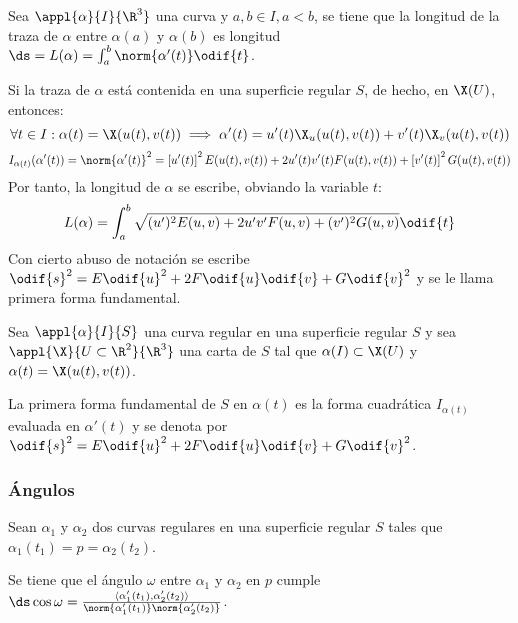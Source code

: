 Sea $\appl{\alpha}{I}{\R^3}$ una curva y $a, b \in I, a < b$, se tiene que la longitud de la traza de $\alpha$ entre $\alpha(a)$ y $\alpha(b)$ es longitud $\ds = L(\alpha) = \int_{a}^{b} \norm{\alpha'(t)} \odif{t}$.

Si la traza de $\alpha$ está contenida en una superficie regular $S$, de hecho, en $\X(U)$, entonces:
\[\forall t \in I : \alpha(t) = \X(u(t), v(t)) \implies \alpha'(t) = u'(t)\X_u(u(t), v(t)) + v'(t)\X_v(u(t), v(t))\]
\[I_{\alpha(t)}(\alpha'(t)) = \norm{\alpha'(t)}^2 = \left[u'(t)\right]^2E(u(t), v(t)) + 2u'(t)v'(t)F(u(t), v(t)) + \left[v'(t)\right]^2G(u(t), v(t))\]
Por tanto, la longitud de $\alpha$ se escribe, obviando la variable $t$:
\[L(\alpha) = \int_{a}^{b} \sqrt{(u')^2E(u,v) + 2u'v'F(u,v) + (v')^2G(u,v)} \odif{t}\]
Con cierto abuso de notación se escribe $\odif{s}^2 = E \odif{u}^2 + 2F\odif{u}\odif{v} + G\odif{v}^2$ y se le llama primera forma fundamental.

\begin{defn}
	Sea $\appl{\alpha}{I}{S}$ una curva regular en una superficie regular $S$ y sea $\appl{\X}{U\subset \R^2}{\R^3}$ una carta de $S$ tal que $\alpha(I) \subset \X(U)$ y $\alpha(t) = \X(u(t), v(t))$.

	La primera forma fundamental de $S$ en $\alpha(t)$ es la forma cuadrática $I_{\alpha(t)}$ evaluada en $\alpha'(t)$ y se denota por $\odif{s}^2 = E\odif{u}^2 + 2F\odif{u}\odif{v} + G\odif{v}^2$.
\end{defn}

\subsubsection{Ángulos}

Sean $\alpha_1$ y $\alpha_2$ dos curvas regulares en una superficie regular $S$ tales que $\alpha_1(t_1) = p = \alpha_2(t_2)$.

Se tiene que el ángulo $\omega$ entre $\alpha_1$ y $\alpha_2$ en $p$ cumple $\ds \cos\omega = \frac{\langle \alpha_1'(t_1), \alpha_2'(t_2) \rangle}{\norm{\alpha_1'(t_1)}\norm{\alpha_2'(t_2)}}$.

